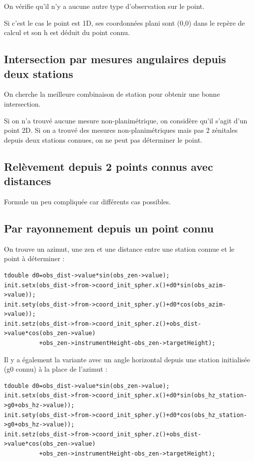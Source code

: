 \documentclass[french]{report}
\begin{document}
On vérifie qu'il n'y a aucune autre type d'observation sur le point.

Si c'est le cas le point est 1D, ses coordonnées plani sont (0,0) dans le repère de calcul et son h est déduit du point connu.

\subsection{Intersection par mesures angulaires depuis deux stations}

On cherche la meilleure combinaison de station pour obtenir une bonne intersection.

Si on n'a trouvé aucune mesure non-planimétrique, on considère qu'il s'agit d'un point 2D.
Si on a trouvé des mesures non-planimétriques mais pas 2 zénitales depuis deux stations connues, on ne peut pas déterminer le point.

\subsection{Relèvement depuis 2 points connus avec distances}

Formule un peu compliquée car différents cas possibles.

\subsection{Par rayonnement depuis un point connu}

On trouve un azimut, une zen et une distance entre une station connue et le point à déterminer :

\begin{verbatim}
tdouble d0=obs_dist->value*sin(obs_zen->value);
init.setx(obs_dist->from->coord_init_spher.x()+d0*sin(obs_azim->value));
init.sety(obs_dist->from->coord_init_spher.y()+d0*cos(obs_azim->value));
init.setz(obs_dist->from->coord_init_spher.z()+obs_dist->value*cos(obs_zen->value)
          +obs_zen->instrumentHeight-obs_zen->targetHeight);
\end{verbatim}

Il y a également la variante avec un angle horizontal depuis une station initialisée (g0 connu) à la place de l'azimut :

\begin{verbatim}
tdouble d0=obs_dist->value*sin(obs_zen->value);
init.setx(obs_dist->from->coord_init_spher.x()+d0*sin(obs_hz_station->g0+obs_hz->value));
init.sety(obs_dist->from->coord_init_spher.y()+d0*cos(obs_hz_station->g0+obs_hz->value));
init.setz(obs_dist->from->coord_init_spher.z()+obs_dist->value*cos(obs_zen->value)
          +obs_zen->instrumentHeight-obs_zen->targetHeight);
\end{verbatim}
\end{document}

